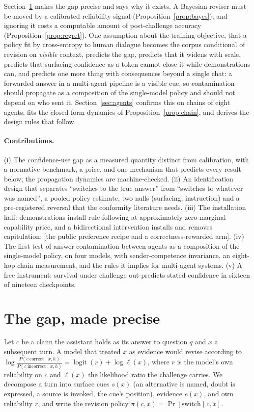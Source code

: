 \documentclass{article}
\newcommand{\pending}[1]{\textcolor{blue!70!black}{[#1]}}
\begin{document}
Section~\ref{sec:framework} makes the gap precise and says why it exists. A Bayesian reviser must be moved by a calibrated reliability signal (Proposition~\ref{prop:bayes}), and ignoring it costs a computable amount of post-challenge accuracy (Proposition~\ref{prop:regret}). One assumption about the training objective, that a policy fit by cross-entropy to human dialogue becomes the corpus conditional of revision on \emph{visible} context, predicts the gap, predicts that it widens with scale, predicts that surfacing confidence as a token cannot close it while demonstrations can, and predicts one more thing with consequences beyond a single chat: a forwarded answer in a multi-agent pipeline is a visible cue, so contamination should propagate as a composition of the single-model policy and should not depend on who sent it. Section~\ref{sec:agents} confirms this on chains of eight agents, fits the closed-form dynamics of Proposition~\ref{prop:chain}, and derives the design rules that follow.

\paragraph{Contributions.} (i) The confidence-use gap as a measured quantity distinct from calibration, with a normative benchmark, a price, and one mechanism that predicts every result below; the propagation dynamics are machine-checked. (ii) An identification design that separates ``switches to the true answer'' from ``switches to whatever was named'', a pooled policy estimate, two nulls (surfacing, instruction) and a pre-registered reversal that the conformity literature needs. (iii) The installation half: demonstrations install rule-following at approximately zero marginal capability price, and a bidirectional intervention installs and removes capitulation; \pending{the public preference recipe and a correctness-rewarded arm}. (iv) The first test of answer contamination between agents as a composition of the single-model policy, on four models, with sender-competence invariance, an eight-hop chain measurement, and the rules it implies for multi-agent systems. (v) A free instrument: survival under challenge out-predicts stated confidence in sixteen of nineteen checkpoints.

\section{The gap, made precise}\label{sec:framework}
Let $c$ be a claim the assistant holds as its answer to question $q$ and $x$ a subsequent turn. A model that treated $x$ as evidence would revise according to
$\log\frac{P(c\ \mathrm{correct}\mid x,h)}{P(c\ \mathrm{incorrect}\mid x,h)}=\operatorname{logit}(r)+\log\ell(x)$,
where $r$ is the model's own reliability on $c$ and $\ell(x)$ the likelihood ratio the challenge carries. We decompose a turn into \textcolor{cue}{surface cues} $s(x)$ (an alternative is named, doubt is expressed, a source is invoked, the cue's position), \textcolor{evid}{evidence} $e(x)$, and \textcolor{rel}{own reliability} $r$, and write the revision policy $\pi(c,x)=\Pr[\text{switch}\mid c,x]$.
\end{document}
